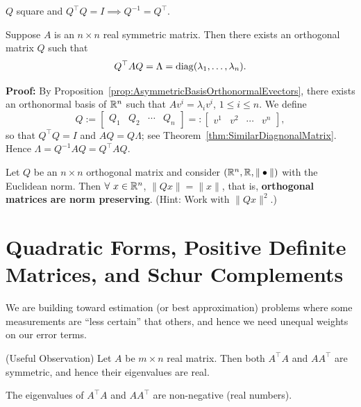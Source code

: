 \begin{rem} $Q$ square and $Q^\top  Q = I \implies Q^{-1}=Q^\top $.
\end{rem}

\begin{prop}  Suppose $A$ is an $n \times n$ real symmetric matrix. Then there exists an orthogonal matrix $Q$ such that 
$$Q^\top A Q=\Lambda={\rm diag}(\lambda_1,\ldots ,\lambda_n).$$
\end{prop}

\textbf{Proof:} By Proposition~\ref{prop:AsymmetricBasisOrthonormalEvectors}, there exists an orthonormal basis of $\mathbb R^n$ such that $Av^i = \lambda_i v^i$, $1 \le i \le n$. We define $$Q:=\begin{bmatrix}Q_1 & Q_2 & \cdots & Q_n \end{bmatrix}=:\begin{bmatrix}v^1 & v^2 & \cdots & v^n \end{bmatrix}, $$
so that $Q^\top Q = I$ and $A Q = Q \Lambda$; see Theorem~\ref{thm:SimilarDiagnonalMatrix}. Hence $ \Lambda = Q^{-1}A  Q = Q^\top A Q$.

\Qed

\begin{exercise} Let $Q$ be an $n \times n$ orthogonal matrix and consider $(\mathbb R^n, \mathbb R, \| \bullet \|)$ with the Euclidean norm. Then $\forall~x \in \mathbb R^n$, $\|Q x\|=\|x\|$, that is, \textbf{orthogonal matrices are norm preserving}. (Hint: Work with $\|Qx\|^2$.)
\end{exercise}

\section{Quadratic Forms, Positive Definite Matrices, and Schur Complements}

We are building toward estimation (or best approximation) problems where some measurements are ``less certain'' that others, and hence we need unequal weights on our error terms.\\

\begin{rem} (Useful Observation) Let $A$ be $m \times n$ real matrix. Then both $A^\top A$ and $AA^\top $ are symmetric, and hence their eigenvalues are real.
\end{rem}

\begin{claim}
The eigenvalues of $A^\top A$ and $AA^\top $ are non-negative (real numbers).
\end{claim} 

